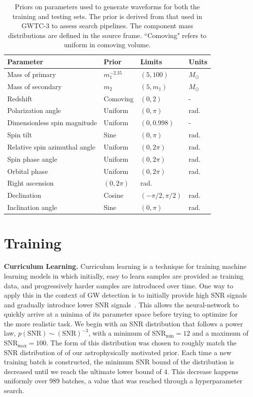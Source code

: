 \begin{refsection}
\begin{table}
\centering
\footnotesize
\begin{tabular}{ p{3.9cm} p{3cm} p{3cm} p{3cm} }
\hline
\hline
Parameter & Prior & Limits & Units\\
\hline
Mass of primary & $m_1^{-2.35}$ & $(5, 100)$ & $M_{\odot}$\\
Mass of secondary & $m_2$ & $(5, m_1)$ & $M_{\odot}$\\
Redshift & Comoving & $(0, 2)$ & -\\
Polarization angle & Uniform & $(0, \pi)$ & rad.\\
Dimensionless spin magnitude & Uniform & $(0, 0.998)$ & -\\
Spin tilt & Sine & $(0, \pi)$ & rad.\\
Relative spin azimuthal angle & Uniform & $(0, 2\pi)$ & rad.\\
Spin phase angle & Uniform & $(0, 2\pi)$ & rad.\\
Orbital phase & Uniform & $(0, 2\pi)$ & rad.\\
Right ascension & $(0, 2\pi)$ & rad.\\
Declination &Cosine & $(-\pi/2, \pi/2)$ & rad.\\
Inclination angle & Sine & $(0, \pi)$ & rad.\\
\hline
\hline
\end{tabular}
\caption[Priors on parameters used to generate waveforms for training and testing \aframe]{Priors on parameters used to generate waveforms for both the training and testing sets. The prior is derived from that used in GWTC-3 to assess search pipelines. The component mass distributions are defined in the source frame. ``Comoving" refers to uniform in comoving volume.}
\label{aframe_meth_tab:priors}
\end{table}

\section{Training}
\label{aframe_meth_sec:training}

\textbf{Curriculum Learning.}
Curriculum learning is a technique for training machine learning models in which initially, easy to learn samples are provided as training data, and progressively harder samples are introduced over time.
One way to apply this in the context of GW detection is to initially provide high SNR signals and gradually introduce lower SNR signals~\cite{nousi2022deep}.
This allows the neural-network to quickly arrive at a minima of its parameter space before trying to optimize for the more realistic task.
We begin with an SNR distribution that follows a power law, $p(\text{SNR}) \sim (\text{SNR})^{-3}$, with a minimum of SNR$_{\text{min}} = 12$ and a maximum of SNR$_{\text{max}} = 100$.
The form of this distribution was chosen to roughly match the SNR distribution of of our astrophysically motivated prior. 
Each time a new training batch is constructed, the minimum SNR bound of the distribution is decreased until we reach the ultimate lower bound of 4.
This decrease happens uniformly over 989 batches, a value that was reached through a hyperparameter search. 



\end{refsection}
